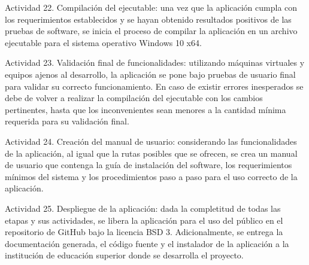 \begin{APAitemize}
    \item Actividad 22. Compilación del ejecutable: una vez que la aplicación cumpla con los requerimientos establecidos y se hayan obtenido resultados positivos de las pruebas de software, se inicia el proceso de compilar la aplicación en un archivo ejecutable para el sistema operativo Windows 10 x64.
    \item Actividad 23. Validación final de funcionalidades: utilizando máquinas virtuales y equipos ajenos al desarrollo, la aplicación se pone bajo pruebas de usuario final para validar su correcto funcionamiento. En caso de existir errores inesperados se debe de volver a realizar la compilación del ejecutable con los cambios pertinentes, hasta que los inconvenientes sean menores a la cantidad mínima requerida para su validación final.
    \item Actividad 24. Creación del manual de usuario: considerando las funcionalidades de la aplicación, al igual que la rutas posibles que se ofrecen, se crea un manual de usuario que contenga la guía de instalación del software, los requerimientos mínimos del sistema y los procedimientos paso a paso para el uso correcto de la aplicación.
    \item Actividad 25. Despliegue de la aplicación: dada la completitud de todas las etapas y sus actividades, se libera la aplicación para el uso del público en el repositorio de GitHub bajo la licencia BSD 3. Adicionalmente, se entrega la documentación generada, el código fuente y el instalador de la aplicación a la institución de educación superior donde se desarrolla el proyecto.
\end{APAitemize}


